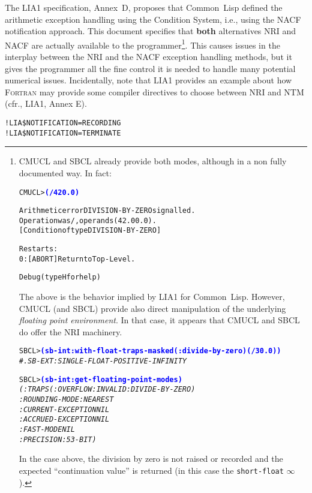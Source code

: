 \documentclass[10pt,fleqn]{article}
\newcommand{\CL}{\textsf{Common~Lisp}}
\newcommand{\CMUCL}{\textsf{CMUCL}}
\newcommand{\SBCL}{\textsf{SBCL}}
\newcommand{\Fortran}{\textsc{\textsf{Fortran}}}
\newcommand{\code}[1]{\texttt{#1}}
\newcommand{\codeprompt}[1]{\textcolor{blue}{\textbf{#1}}}
\begin{document}
The LIA1 specification, Annex~D, proposes that \CL{} defined the
arithmetic exception handling using the Condition System, i.e., using
the NACF notification approach.  This document specifies that
\textbf{both} alternatives NRI and NACF are actually available to the
programmer\footnote{\CMUCL{} and \SBCL{} already provide
  both modes, although in a non fully documented way. In fact:

\begin{alltt}
CMUCL> \codeprompt{(/ 42 0.0)}

Arithmetic error DIVISION-BY-ZERO signalled.
Operation was /, operands (42.0 0.0).
   [Condition of type DIVISION-BY-ZERO]

Restarts:
  0: [ABORT] Return to Top-Level.

Debug  (type H for help)
\end{alltt}
  The above is the behavior implied by LIA1 for \CL{}.  However,
  \CMUCL{} (and \SBCL{}) provide also direct manipulation of the
  underlying \emph{floating point environment}.  In that case, it
  appears that \CMUCL{} and \SBCL{} do offer the NRI machinery.
\begin{alltt}
SBCL> \codeprompt{(sb-int:with-float-traps-masked (:divide-by-zero) (/ 3 0.0))}
\textit{\#.SB-EXT:SINGLE-FLOAT-POSITIVE-INFINITY}

SBCL> \codeprompt{(sb-int:get-floating-point-modes)}\\
\textit{(:TRAPS (:OVERFLOW :INVALID :DIVIDE-BY-ZERO)\\
  :ROUNDING-MODE :NEAREST\\
  :CURRENT-EXCEPTION NIL\\
  :ACCRUED-EXCEPTION NIL\\
  :FAST-MODE NIL\\
  :PRECISION :53-BIT)}
\end{alltt}
In the case above, the division by zero is not raised or recorded and
the expected ``continuation value'' is returned (in this case the
\code{short-float} $\infty$).
}.
This causes issues in the interplay between the NRI and the NACF
exception handling methods, but it gives the programmer all the fine
control it is needed to handle many potential numerical
issues. Incidentally, note that LIA1 provides an example about how
\Fortran{} may provide some compiler directives to choose between NRI
and NTM (cfr., LIA1, Annex E).
\begin{alltt}
!LIA\$  NOTIFICATION=RECORDING
!LIA\$  NOTIFICATION=TERMINATE
\end{alltt}
\end{document}
